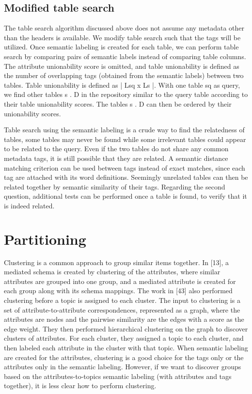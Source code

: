 \subsection{Modified table search}
\label{ssec:ModifiedTableSearch}

The table search algorithm discussed above does not assume any metadata other than the headers is available. We modify table search such that the tags will be utilized. Once semantic labeling is created for each table, we can perform table search by comparing pairs of semantic labels instead of comparing table columns. The attribute unionability score is omitted, and table unionability is defined as the number of overlapping tags (obtained from the semantic labels) between two tables. Table unionability is defined as | Lsq x Ls |. With one table sq as query, we find other tables s . D in the repository similar to the query table according to their table unionability scores. The tables s . D can then be ordered by their unionability scores.

Table search using the semantic labeling is a crude way to find the relatedness of tables, some tables may never be found while some irrelevant tables could appear to be related to the query. Even if the two tables do not share any common metadata tags, it is still possible that they are related. A semantic distance matching criterion can be used between tags instead of exact matches, since each tag are attached with its word definitions. Seemingly unrelated tables can then be related together by semantic similarity of their tags. Regarding the second question, additional tests can be performed once a table is found, to verify that it is indeed related.

\section{Partitioning}
\label{sec:Partitioning}

Clustering is a common approach to group similar items together. In \cite{ilprints851}[13], a mediated schema is created by clustering of the attributes, where similar attributes are grouped into one group, and a mediated attribute is created for each group along with its schema mappings. The work in \cite{Smith2011Unity}[43] also performed clustering before a topic is assigned to each cluster. The input to clustering is a set of attribute-to-attribute correspondences, represented as a graph, where the attributes are nodes and the pairwise similarity are the edges with a score as the edge weight. They then performed hierarchical clustering on the graph to discover clusters of attributes. For each cluster, they assigned a topic to each cluster, and then labeled each attribute in the cluster with that topic.
When semantic labeling are created for the attributes, clustering is a good choice for the tags only or the attributes only in the semantic labeling. However, if we want to discover groups based on the attributes-to-topics semantic labeling (with attributes and tags together), it is less clear how to perform clustering.


